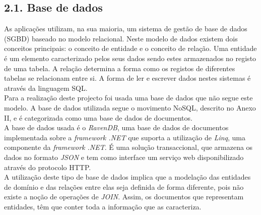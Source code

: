 \documentclass[]{article}
\begin{document}
\subsection{2.1. Base de dados}
As aplicações utilizam, na sua maioria, um sistema de gestão de base de dados (SGBD) baseado no modelo relacional. Neste modelo de dados existem dois conceitos principais: o conceito de entidade e o conceito de relação. Uma entidade é um elemento caracterizado pelos seus dados sendo estes armazenados no registo de uma tabela. A relação determina a forma como os registos de diferentes tabelas se relacionam entre si. A forma de ler e escrever dados nestes sistemas é através da linguagem SQL.\\

Para a realização deste projecto foi usada uma base de dados que não segue este modelo. A base de dados utilizada segue o movimento NoSQL, descrito no Anexo II, e é categorizada como uma base de dados de documentos.\\

A base de dados usada é o \emph{RavenDB}\cite{ravendb}, uma base de dados de documentos implementada sobre a \emph{framework .NET}\cite{net} que suporta a utilização de \emph{Linq}\cite{linq}, uma componente da \emph{framework .NET}\cite{net}. É uma solução transaccional, que armazena os dados no formato \emph{JSON}\cite{json} e tem como interface um serviço web disponibilizado através do protocolo HTTP.\\

A utilização deste tipo de base de dados implica que a modelação das entidades de domínio e das relações entre elas seja definida de forma diferente, pois não existe a noção de operações de \emph{JOIN}. Assim, os documentos que representam entidades, têm que conter toda a informação que as caracteriza.\\
\end{document}
